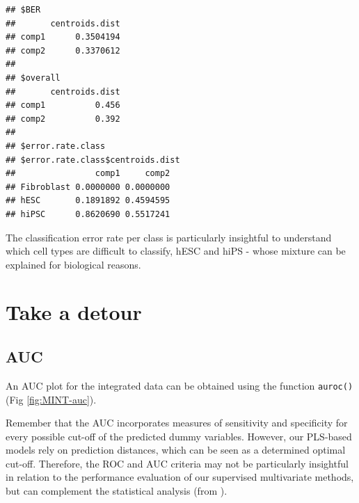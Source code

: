 \documentclass[]{book}
\newenvironment{Shaded}{\begin{snugshade}}{\end{snugshade}}
\newcommand{\CommentTok}[1]{\textcolor[rgb]{0.56,0.35,0.01}{\textit{#1}}}
\newcommand{\DataTypeTok}[1]{\textcolor[rgb]{0.13,0.29,0.53}{#1}}
\newcommand{\DecValTok}[1]{\textcolor[rgb]{0.00,0.00,0.81}{#1}}
\newcommand{\KeywordTok}[1]{\textcolor[rgb]{0.13,0.29,0.53}{\textbf{#1}}}
\newcommand{\NormalTok}[1]{#1}
\newcommand{\OperatorTok}[1]{\textcolor[rgb]{0.81,0.36,0.00}{\textbf{#1}}}
\newcommand{\StringTok}[1]{\textcolor[rgb]{0.31,0.60,0.02}{#1}}
\begin{document}
\begin{Shaded}
\end{Shaded}

\begin{verbatim}
## $BER
##       centroids.dist
## comp1      0.3504194
## comp2      0.3370612
## 
## $overall
##       centroids.dist
## comp1          0.456
## comp2          0.392
## 
## $error.rate.class
## $error.rate.class$centroids.dist
##                comp1     comp2
## Fibroblast 0.0000000 0.0000000
## hESC       0.1891892 0.4594595
## hiPSC      0.8620690 0.5517241
\end{verbatim}

The classification error rate per class is particularly insightful to understand which cell types are difficult to classify, hESC and hiPS - whose mixture can be explained for biological reasons.

\hypertarget{mint:detour}{%
\section{Take a detour}\label{mint:detour}}

\hypertarget{auc}{%
\subsection{AUC}\label{auc}}

An AUC plot for the integrated data can be obtained using the function \texttt{auroc()} (Fig \ref{fig:MINT-auc}).

Remember that the AUC incorporates measures of sensitivity and specificity for every possible cut-off of the predicted dummy variables. However, our PLS-based models rely on prediction distances, which can be seen as a determined optimal cut-off. Therefore, the ROC and AUC criteria may not be particularly insightful in relation to the performance evaluation of our supervised multivariate methods, but can complement the statistical analysis (from \citet{Roh17}).
\end{document}
